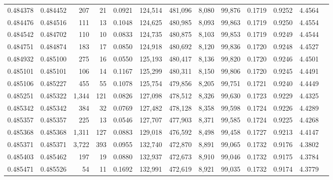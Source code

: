 \begin{tabular}{rrrrrrrrrrrrr}
0.484378 & 0.484452 &   207 &    21 &                                     0.0921 & 124,514 & 481,096 &   8,080 &  99,876 & 0.1719 & 0.9252 & 4.4564 \\
0.484476 & 0.484516 &   111 &    13 &                                     0.1048 & 124,625 & 480,985 &   8,093 &  99,863 & 0.1719 & 0.9250 & 4.4554 \\
0.484542 & 0.484702 &   110 &    10 &                                     0.0833 & 124,735 & 480,875 &   8,103 &  99,853 & 0.1719 & 0.9249 & 4.4544 \\
0.484751 & 0.484874 &   183 &    17 &                                     0.0850 & 124,918 & 480,692 &   8,120 &  99,836 & 0.1720 & 0.9248 & 4.4527 \\
0.484932 & 0.485100 &   275 &    16 &                                     0.0550 & 125,193 & 480,417 &   8,136 &  99,820 & 0.1720 & 0.9246 & 4.4501 \\
0.485101 & 0.485101 &   106 &    14 &                                     0.1167 & 125,299 & 480,311 &   8,150 &  99,806 & 0.1720 & 0.9245 & 4.4491 \\
0.485106 & 0.485227 &   455 &    55 &                                     0.1078 & 125,754 & 479,856 &   8,205 &  99,751 & 0.1721 & 0.9240 & 4.4449 \\
0.485251 & 0.485322 & 1,344 &   121 &                                     0.0826 & 127,098 & 478,512 &   8,326 &  99,630 & 0.1723 & 0.9229 & 4.4325 \\
0.485342 & 0.485342 &   384 &    32 &                                     0.0769 & 127,482 & 478,128 &   8,358 &  99,598 & 0.1724 & 0.9226 & 4.4289 \\
0.485357 & 0.485357 &   225 &    13 &                                     0.0546 & 127,707 & 477,903 &   8,371 &  99,585 & 0.1724 & 0.9225 & 4.4268 \\
0.485368 & 0.485368 & 1,311 &   127 &                                     0.0883 & 129,018 & 476,592 &   8,498 &  99,458 & 0.1727 & 0.9213 & 4.4147 \\
0.485371 & 0.485371 & 3,722 &   393 &                                     0.0955 & 132,740 & 472,870 &   8,891 &  99,065 & 0.1732 & 0.9176 & 4.3802 \\
0.485403 & 0.485462 &   197 &    19 &                                     0.0880 & 132,937 & 472,673 &   8,910 &  99,046 & 0.1732 & 0.9175 & 4.3784 \\
0.485471 & 0.485526 &    54 &    11 &                                     0.1692 & 132,991 & 472,619 &   8,921 &  99,035 & 0.1732 & 0.9174 & 4.3779 \\

\end{tabular}
